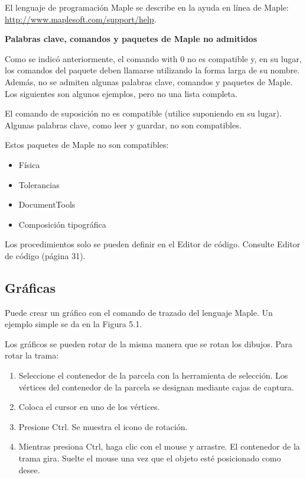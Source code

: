 El lenguaje de programación Maple se describe en la ayuda en línea de Maple: \href{http://www.maplesoft.com/support/help}{http://www.maplesoft.com/support/help}.

\textbf{Palabras clave, comandos y paquetes de Maple no admitidos}

Como se indicó anteriormente, el comando with 0 no es compatible y, en su lugar, los comandos del paquete deben llamarse utilizando la forma larga de su nombre. Además, no se admiten algunas palabras clave, comandos y paquetes de Maple. Los siguientes son algunos ejemplos, pero no una lista completa.

El comando de suposición no es compatible (utilice suponiendo en su lugar). Algunas palabras clave, como leer y guardar, no son compatibles.

Estos paquetes de Maple no son compatibles:

\begin{itemize}
	\item Física
	
	\item Tolerancias
	
	\item DocumentTools
	
	\item Composición tipográfica
	
\end{itemize}

Los procedimientos solo se pueden definir en el Editor de código. Consulte Editor de código (página 31).

\subsection{Gráficas}
Puede crear un gráfico con el comando de trazado del lenguaje Maple. Un ejemplo simple se da en la Figura 5.1.



Los gráficos se pueden rotar de la misma manera que se rotan los dibujos. Para rotar la trama:

\begin{enumerate}
	\item Seleccione el contenedor de la parcela con la herramienta de selección. Los vértices del contenedor de la parcela se designan mediante cajas de captura.
	
	\item Coloca el cursor en uno de los vértices.
	
	\item Presione Ctrl. Se muestra el icono de rotación.
	
	\item Mientras presiona Ctrl, haga clic con el mouse y arrastre. El contenedor de la trama gira. Suelte el mouse una vez que el objeto esté posicionado como desee.
	
\end{enumerate}

